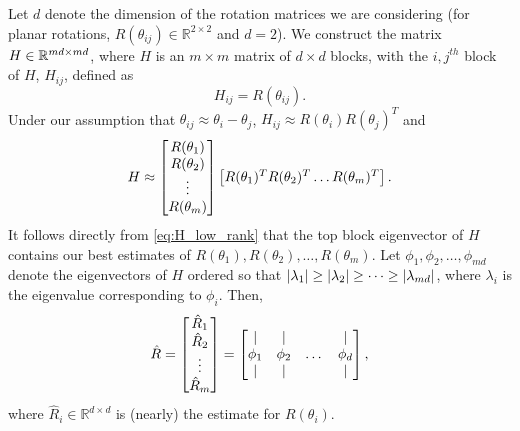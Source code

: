 Let $d$ denote the dimension of the rotation matrices we are considering (for planar rotations, $R(\theta_{ij}) \in \mathbb{R}^{2 \times 2}$ and $d=2$).
%
We construct the matrix $H \in \mathbb{R}^{m d \times m d}$, where $H$ is an $m \times m$ matrix of $d \times d$ blocks, with the $i,j^{th}$ block of $H$, $H_{ij}$, defined as
\begin{equation} \label{eq:H_to_R}
H_{ij} = R(\theta_{ij}).
\end{equation}
%
%
Under our assumption that $\theta_{ij} \approx \theta_i - \theta_j$, $H_{ij} \approx R(\theta_i) R(\theta_j)^T$
 and
\begin{equation} \label{eq:H_low_rank}
	H \approx
	\begin{bmatrix}
	R(\theta_1) \\
	R(\theta_2) \\
	\vdots \\
	R(\theta_m)
	\end{bmatrix}
	\begin{bmatrix}
	R(\theta_1)^T R(\theta_2)^T \dots R(\theta_m)^T
	\end{bmatrix}.
\end{equation}
%
It follows directly from \eqref{eq:H_low_rank} that the top block eigenvector of $H$ contains our best estimates of $R(\theta_1), R(\theta_2), \dots, R(\theta_m)$.
%
Let $\phi_1, \phi_2, \dots, \phi_{md}$ denote the eigenvectors of $H$ ordered so that $|\lambda_1| \ge |\lambda_2| \ge \dots \ge |\lambda_{m d}|$, where $\lambda_i$ is the eigenvalue corresponding to $\phi_i$.
%
Then,
\begin{equation} \label{eq:R_hat}
\hat{R} =
\begin{bmatrix}
\hat{R}_1 \\
\hat{R}_2 \\
\vdots \\
\hat{R}_m
\end{bmatrix} =
\begin{bmatrix}
| & | & & | \\
\phi_1 & \phi_2 & \dots & \phi_d \\
| & | & & |
\end{bmatrix},
\end{equation}
where $\hat{R}_i \in \mathbb{R}^{d \times d}$ is (nearly) the estimate for $R(\theta_i)$.
